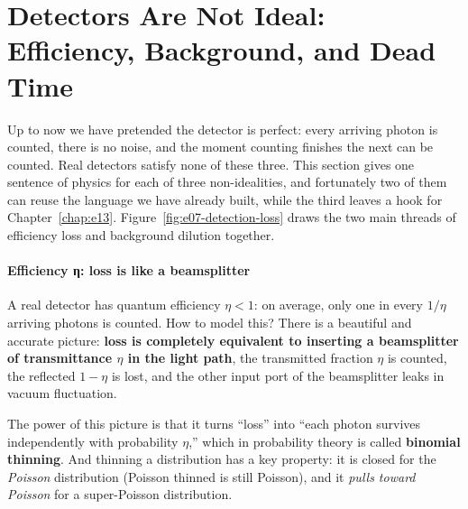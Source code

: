 \section{Detectors Are Not Ideal: Efficiency, Background, and Dead Time}
\label{sec:e07-nonideal}

Up to now we have pretended the detector is perfect: every arriving photon is counted, there is no noise, and the moment counting finishes the next can be counted. Real detectors satisfy none of these three. This section gives one sentence of physics for each of three non-idealities, and fortunately two of them can reuse the language we have already built, while the third leaves a hook for Chapter~\ref{chap:e13}. Figure~\ref{fig:e07-detection-loss} draws the two main threads of efficiency loss and background dilution together.

\paragraph{Efficiency η: loss is like a beamsplitter}
\label{sec:e07-efficiency}

A real detector has quantum efficiency \(\eta<1\): on average, only one in every \(1/\eta\) arriving photons is counted. How to model this? There is a beautiful and accurate picture: \textbf{loss is completely equivalent to inserting a beamsplitter of transmittance \(\eta\) in the light path}, the transmitted fraction \(\eta\) is counted, the reflected \(1-\eta\) is lost, and the other input port of the beamsplitter leaks in vacuum fluctuation.

The power of this picture is that it turns ``loss'' into ``each photon survives independently with probability \(\eta\),'' which in probability theory is called \textbf{binomial thinning}. And thinning a distribution has a key property: it is closed for the \emph{Poisson} distribution (Poisson thinned is still Poisson), and it \emph{pulls toward Poisson} for a super-Poisson distribution.

